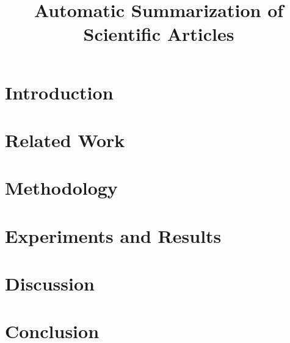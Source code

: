\documentclass[12pt]{report}
\title{Automatic Summarization of Scientific Articles}
\date{}
\begin{document}
\maketitle

\tableofcontents

\begin{abstract}

\end{abstract}

\chapter*{Introduction}
\label{section:introduction}


\chapter*{Related Work}
\label{section:related work}


\chapter*{Methodology}
\label{section: method}


\chapter*{Experiments and Results}
\label{section:experiments}


\chapter*{Discussion}
\label{section:discussion}


\chapter*{Conclusion}
\label{section:conclusion}






\end{document}

